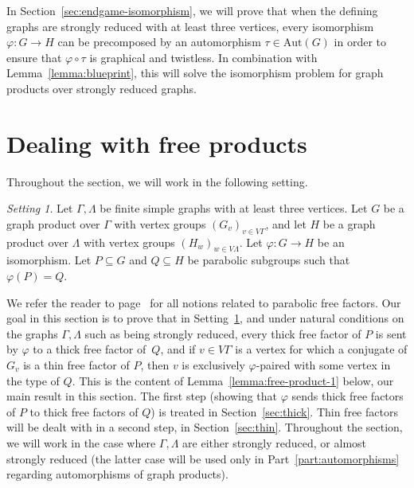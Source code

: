 \documentclass[a4paper,english,11pt]{article}
\theoremstyle{definition}
\theoremstyle{remark}
\newtheorem{setting}[de]{Setting}
\newcommand{\Aut}{\mathrm{Aut}}
\begin{document}
In Section~\ref{sec:endgame-isomorphism}, we will prove that when the defining graphs are strongly reduced with at least three vertices,  every isomorphism $\varphi:G\to H$ can be precomposed by an automorphism $\tau\in\Aut(G)$ in order to ensure that $\varphi\circ\tau$ is graphical and twistless. In combination with Lemma~\ref{lemma:blueprint}, this will solve the isomorphism problem for graph products over strongly reduced graphs.

\section{Dealing with free products}\label{sec:free-products}

Throughout the section, we will work in the following setting.

\begin{SettingBox}
\begin{setting}\label{setting:free-product}
Let $\Gamma,\Lambda$ be finite simple graphs with at least three vertices. Let $G$ be a graph product over $\Gamma$ with vertex groups $(G_v)_{v\in V\Gamma}$, and let $H$ be a graph product over $\Lambda$ with vertex groups $(H_w)_{w\in V\Lambda}$. Let $\varphi:G\to H$ be an isomorphism. Let $P\subseteq G$ and $Q\subseteq H$ be parabolic subgroups such that $\varphi(P)=Q$. 
\end{setting}
\end{SettingBox}

We refer the reader to page~\pageref{thick} for all notions related to parabolic free factors. Our goal in this section is to prove that in Setting~\ref{setting:free-product}, and  under natural conditions on the graphs $\Gamma,\Lambda$ such as being strongly reduced, every thick free factor of $P$ is sent by $\varphi$ to a thick free factor of~$Q$, and if $v\in V\Gamma$ is a vertex for which a conjugate of $G_v$ is a thin free factor of $P$, then $v$ is exclusively $\varphi$-paired with some vertex in the type of $Q$. This is the content of Lemma~\ref{lemma:free-product-1} below, our main result in this section. The first step (showing that $\varphi$ sends thick free factors of $P$ to thick free factors of $Q$) is treated in Section~\ref{sec:thick}. Thin free factors will be dealt with in a second step, in Section~\ref{sec:thin}. Throughout the section, we will work in the case where $\Gamma,\Lambda$ are either strongly reduced, or almost strongly reduced (the latter case will be used only in Part~\ref{part:automorphisms} regarding automorphisms of graph products).
\end{document}
